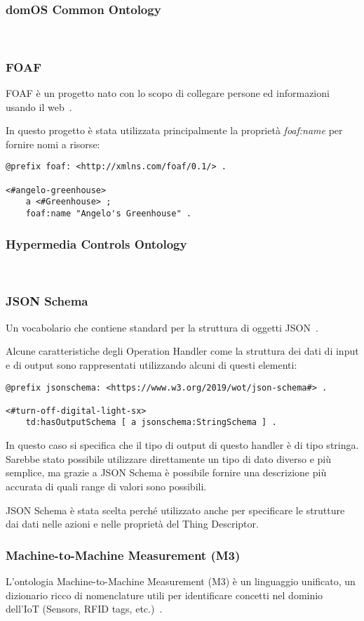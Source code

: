 \subsubsection{domOS Common Ontology}
~\cite{domOSCom57:online}
\subsubsection{FOAF}
FOAF è un progetto nato con lo scopo di collegare persone ed informazioni usando il web~\cite{FOAFVoca16:online}.

\noindent In questo progetto è stata utilizzata principalmente la proprietà \textit{foaf:name} per fornire nomi a risorse:
\begin{verbatim}
@prefix foaf: <http://xmlns.com/foaf/0.1/> .

<#angelo-greenhouse>
	a <#Greenhouse> ;
	foaf:name "Angelo's Greenhouse" .
\end{verbatim}

\subsubsection{Hypermedia Controls Ontology}
~\cite{Hypermed84:online}
\subsubsection{JSON Schema}
Un vocabolario che contiene standard per la struttura di oggetti JSON~\cite{JSONSche6:online}.

\noindent Alcune caratteristiche degli Operation Handler come la struttura dei dati di input e di output sono rappresentati utilizzando alcuni di questi elementi:
\begin{verbatim}
@prefix jsonschema: <https://www.w3.org/2019/wot/json-schema#> .

<#turn-off-digital-light-sx>
	td:hasOutputSchema [ a jsonschema:StringSchema ] .
\end{verbatim}
\noindent In questo caso si specifica che il tipo di output di questo handler è di tipo stringa. Sarebbe stato possibile utilizzare direttamente un tipo di dato diverso e più semplice, ma grazie a JSON Schema è possibile fornire una descrizione più accurata di quali range di valori sono possibili.

\noindent JSON Schema è stata scelta perché utilizzato anche per specificare le strutture dai dati nelle azioni e nelle proprietà del Thing Descriptor.


\subsubsection{Machine-to-Machine Measurement (M3)}
L'ontologia Machine-to-Machine Measurement (M3) è un linguaggio unificato, un dizionario ricco di nomenclature utili per identificare concetti nel dominio dell'IoT (Sensors, RFID tags, etc.)~\cite{SWoTSema18:online}.

